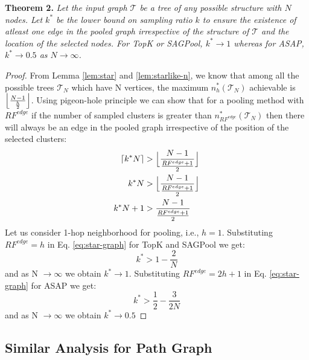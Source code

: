 \documentclass[letterpaper]{article} \usepackage{aaai20}  \usepackage{times}  \usepackage{helvet} \usepackage{courier}  \usepackage[hyphens]{url}  \usepackage{graphicx} \urlstyle{rm} \def\UrlFont{\rm}  \usepackage{graphicx}  \frenchspacing  \setlength{\pdfpagewidth}{8.5in}  \setlength{\pdfpageheight}{11in}
\begin{document}
	
\textbf{Theorem 2.}
	\textit{
		Let the input graph $\mathcal{T}$ be a tree of any possible structure with $N$ nodes. Let $k^{*}$ be the lower bound on sampling ratio $k$ to ensure the existence of atleast one edge in the pooled graph irrespective of the structure of $\mathcal{T}$ and the location of the selected nodes. For TopK or SAGPool, $k^{*} \rightarrow 1$ whereas for ASAP, $k^{*} \rightarrow 0.5$ as $N \rightarrow \infty$.
	}
	\begin{proof}
		From Lemma \eqref{lem:star} and \eqref{lem:starlike-n}, we know that among all the possible trees $\mathcal{T}_{N}$ which have N vertices, the maximum $n^{*}_{h}(\mathcal{T}_{N})$ achievable is $ \Bigl \lfloor \frac{N-1}{\frac{h}{2}} \Bigr \rfloor$. Using pigeon-hole principle we can show that for a pooling method with $RF^{edge}$ if the number of sampled clusters is greater than $n^{*}_{RF^{edge} }(\mathcal{T}_{N})$ then there will always be an edge in the pooled graph irrespective of the position of the selected clusters: 
		\begin{equation}
		\begin{split}
		\label{eq:star-graph}
		\lceil k^{*}N \rceil &> \Bigl \lfloor \frac{N-1}{\frac{ RF^{edge}+1}{2}} \Bigr \rfloor  \\
k^{*}N &> \Bigl \lfloor \frac{N-1}{\frac{RF^{edge}+1}{2}} \Bigr \rfloor \\
k^{*}N + 1 &> \frac{N-1}{\frac{RF^{edge}+1}{2}}
		\end{split}
		\end{equation}
		Let us consider 1-hop neighborhood for pooling, i.e., $h = 1$. Substituting $RF^{edge} = h$ in Eq. \eqref{eq:star-graph} for TopK and SAGPool we get:
		\begin{equation}
		\nonumber
		k^{*} > 1 - \frac{2}{N}
		\end{equation}
		and as N $\rightarrow \infty$ we obtain $k^{*} \rightarrow 1$. Substituting $RF^{edge} = 2h+1$ in Eq. \eqref{eq:star-graph} for ASAP we get:
		\begin{equation}
		\nonumber
		k^{*} > \frac{1}{2} - \frac{3}{2N}
		\end{equation}
		and as N $\rightarrow \infty$ we obtain $k^{*} \rightarrow 0.5$
	\end{proof}
	
	


	
	
	
\subsection{\Large Similar Analysis for Path Graph}
	\label{ssec:proof-3}
	
\end{document}
